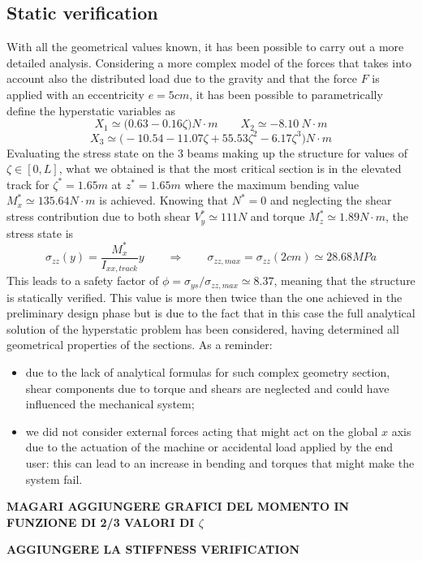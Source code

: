 \subsection{Static verification}
	With all the geometrical values known, it has been possible to carry out a more detailed analysis. Considering a more complex model of the forces that takes into account also the distributed load due to the gravity and that the force $F$ is applied with an eccentricity $e=5cm$, it has been possible to parametrically define the hyperstatic variables as
	\[ X_1 \simeq \big( 0.63-0.16\zeta\big) N\cdot m \qquad X_2 \simeq -8.10 \ N\cdot m \] \[ X_3 \simeq \big( - 10.54 - 11.07\zeta + 55.53\zeta^2 - 6.17\zeta^3 \big) N\cdot m \]
	Evaluating the stress state on the 3 beams making up the structure for values of $\zeta \in [0,L]$, what we obtained is that the most critical section is in the elevated track for $\zeta^* = 1.65m$ at $z^* = 1.65m$ where the maximum bending value $M_x^* \simeq 135.64N\cdot m$ is achieved. Knowing that $N^* = 0$ and neglecting the shear stress contribution due to both shear $V_y^* \simeq 111N$ and torque $M_z^* \simeq 1.89N\cdot m$, the stress state is
	\[ \sigma_{zz}(y) = \frac{M_x^*}{I_{xx,track}}y \qquad \Rightarrow \qquad \sigma_{zz,max} = \sigma_{zz}(2cm) \simeq 28.68 MPa   \]
	This leads to a safety factor of $\phi = \sigma_{ys}/\sigma_{zz,max} \simeq 8.37$, meaning that the structure is statically verified. This value is more then twice than the one achieved in the preliminary design phase but is due to the fact that in this case the full analytical solution of the hyperstatic problem has been considered, having determined all geometrical properties of the sections. As a reminder:
	\begin{itemize}
		\item due to the lack of analytical formulas for such complex geometry section, shear components due to torque and shears are neglected and could have influenced the mechanical system;
		\item we did not consider external forces acting that might act on the global $x$ axis due to the actuation of the machine or accidental load applied by the end user: this can lead to an increase in bending and torques that might make the system fail.
	\end{itemize}

	\textbf{MAGARI AGGIUNGERE GRAFICI DEL MOMENTO IN FUNZIONE DI 2/3 VALORI DI $\zeta$}
	
	\textbf{AGGIUNGERE LA STIFFNESS VERIFICATION}